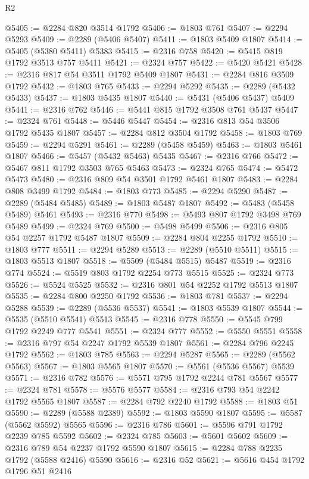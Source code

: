 \begin{lexlean}{R2}
\begin{coremodule}
@5405 := @2284 @820 @3514 @1792
@5406 := @1803 @761
@5407 := @2294 @5293
@5409 := @2289 (@5406 @5407)
@5411 := @1803 @5409 @1807
@5414 := @5405 (@5380 @5411) @5383
@5415 := @2316 @758
@5420 := @5415 @819 @1792 @3513 @757 @5411
@5421 := @2324 @757
@5422 := @5420 @5421
@5428 := @2316 @817 @54 @3511 @1792 @5409 @1807
@5431 := @2284 @816 @3509 @1792
@5432 := @1803 @765
@5433 := @2294 @5292
@5435 := @2289 (@5432 @5433)
@5437 := @1803 @5435 @1807
@5440 := @5431 (@5406 @5437) @5409
@5441 := @2316 @762
@5446 := @5441 @815 @1792 @3508 @761 @5437
@5447 := @2324 @761
@5448 := @5446 @5447
@5454 := @2316 @813 @54 @3506 @1792 @5435 @1807
@5457 := @2284 @812 @3504 @1792
@5458 := @1803 @769
@5459 := @2294 @5291
@5461 := @2289 (@5458 @5459)
@5463 := @1803 @5461 @1807
@5466 := @5457 (@5432 @5463) @5435
@5467 := @2316 @766
@5472 := @5467 @811 @1792 @3503 @765 @5463
@5473 := @2324 @765
@5474 := @5472 @5473
@5480 := @2316 @809 @54 @3501 @1792 @5461 @1807
@5483 := @2284 @808 @3499 @1792
@5484 := @1803 @773
@5485 := @2294 @5290
@5487 := @2289 (@5484 @5485)
@5489 := @1803 @5487 @1807
@5492 := @5483 (@5458 @5489) @5461
@5493 := @2316 @770
@5498 := @5493 @807 @1792 @3498 @769 @5489
@5499 := @2324 @769
@5500 := @5498 @5499
@5506 := @2316 @805 @54 @2257 @1792 @5487 @1807
@5509 := @2284 @804 @2255 @1792
@5510 := @1803 @777
@5511 := @2294 @5289
@5513 := @2289 (@5510 @5511)
@5515 := @1803 @5513 @1807
@5518 := @5509 (@5484 @5515) @5487
@5519 := @2316 @774
@5524 := @5519 @803 @1792 @2254 @773 @5515
@5525 := @2324 @773
@5526 := @5524 @5525
@5532 := @2316 @801 @54 @2252 @1792 @5513 @1807
@5535 := @2284 @800 @2250 @1792
@5536 := @1803 @781
@5537 := @2294 @5288
@5539 := @2289 (@5536 @5537)
@5541 := @1803 @5539 @1807
@5544 := @5535 (@5510 @5541) @5513
@5545 := @2316 @778
@5550 := @5545 @799 @1792 @2249 @777 @5541
@5551 := @2324 @777
@5552 := @5550 @5551
@5558 := @2316 @797 @54 @2247 @1792 @5539 @1807
@5561 := @2284 @796 @2245 @1792
@5562 := @1803 @785
@5563 := @2294 @5287
@5565 := @2289 (@5562 @5563)
@5567 := @1803 @5565 @1807
@5570 := @5561 (@5536 @5567) @5539
@5571 := @2316 @782
@5576 := @5571 @795 @1792 @2244 @781 @5567
@5577 := @2324 @781
@5578 := @5576 @5577
@5584 := @2316 @793 @54 @2242 @1792 @5565 @1807
@5587 := @2284 @792 @2240 @1792
@5588 := @1803 @51
@5590 := @2289 (@5588 @2389)
@5592 := @1803 @5590 @1807
@5595 := @5587 (@5562 @5592) @5565
@5596 := @2316 @786
@5601 := @5596 @791 @1792 @2239 @785 @5592
@5602 := @2324 @785
@5603 := @5601 @5602
@5609 := @2316 @789 @54 @2237 @1792 @5590 @1807
@5615 := @2284 @788 @2235 @1792 (@5588 @2416) @5590
@5616 := @2316 @52
@5621 := @5616 @454 @1792 @1796 @51 @2416

\end{coremodule}
\end{lexlean}
